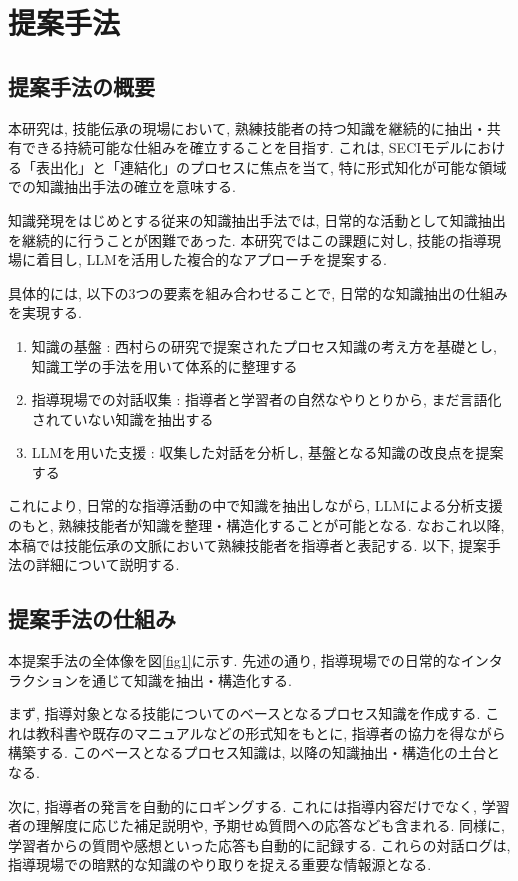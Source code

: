 \chapter{提案手法}
\section{提案手法の概要}
本研究は, 技能伝承の現場において, 熟練技能者の持つ知識を継続的に抽出・共有できる持続可能な仕組みを確立することを目指す. これは, SECIモデルにおける「表出化」と「連結化」のプロセスに焦点を当て, 特に形式知化が可能な領域での知識抽出手法の確立を意味する.

知識発現\cite{Nishimura2017}をはじめとする従来の知識抽出手法では, 日常的な活動として知識抽出を継続的に行うことが困難であった. 本研究ではこの課題に対し, 技能の指導現場に着目し, LLMを活用した複合的なアプローチを提案する. 

具体的には, 以下の3つの要素を組み合わせることで, 日常的な知識抽出の仕組みを実現する.
\begin{enumerate}
    \item 知識の基盤 : 西村らの研究で提案されたプロセス知識の考え方を基礎とし, 知識工学の手法を用いて体系的に整理する
    \item 指導現場での対話収集 : 指導者と学習者の自然なやりとりから, まだ言語化されていない知識を抽出する
    \item LLMを用いた支援 : 収集した対話を分析し, 基盤となる知識の改良点を提案する
\end{enumerate}

これにより, 日常的な指導活動の中で知識を抽出しながら, LLMによる分析支援のもと, 熟練技能者が知識を整理・構造化することが可能となる. なおこれ以降, 本稿では技能伝承の文脈において熟練技能者を指導者と表記する. 以下, 提案手法の詳細について説明する.

\section{提案手法の仕組み}
本提案手法の全体像を図\ref{fig1}に示す. 先述の通り, 指導現場での日常的なインタラクションを通じて知識を抽出・構造化する.

まず, 指導対象となる技能についてのベースとなるプロセス知識を作成する. これは教科書や既存のマニュアルなどの形式知をもとに, 指導者の協力を得ながら構築する. このベースとなるプロセス知識は, 以降の知識抽出・構造化の土台となる. 

次に, 指導者の発言を自動的にロギングする. これには指導内容だけでなく, 学習者の理解度に応じた補足説明や, 予期せぬ質問への応答なども含まれる. 同様に, 学習者からの質問や感想といった応答も自動的に記録する. これらの対話ログは, 指導現場での暗黙的な知識のやり取りを捉える重要な情報源となる. 

